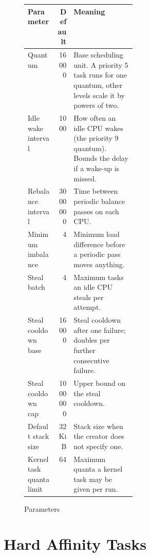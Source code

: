 \documentclass[11pt]{article}
\begin{document}
\begin{figure}[H]
	\centering
	\begin{tabularx}{\linewidth}{@{}>{\raggedright\arraybackslash}p{0.27\linewidth}rX@{}}
		\toprule
		\textbf{Parameter}       & \textbf{Default} & \textbf{Meaning}                                                                                      \\
		\midrule
		Quantum                  & 16000            & Base scheduling unit. A priority 5 task runs for one quantum, other levels scale it by powers of two. \\
		Idle wake interval       & 1000             & How often an idle CPU wakes (the priority 9 quantum). Bounds the delay if a wake-up is missed.        \\
		Rebalance interval       & 3000000          & Time between periodic balance passes on each CPU.                                                     \\
		Minimum imbalance        & 4                & Minimum load difference before a periodic pass moves anything.                                        \\
		Steal batch              & 4                & Maximum tasks an idle CPU steals per attempt.                                                         \\
		Steal cooldown base      & 16000            & Steal cooldown after one failure; doubles per further consecutive failure.                            \\
		Steal cooldown cap       & 1000000          & Upper bound on the steal cooldown.                                                                    \\
		Default stack size       & 32 KiB           & Stack size when the creator does not specify one.                                                     \\
		Kernel task quanta limit & 64               & Maximum quanta a kernel task may be given per run.                                                    \\
		\bottomrule
	\end{tabularx}
	\caption{Parameters}
	\label{fig:tunables}
\end{figure}

\section{Hard Affinity Tasks}
\label{sec:hard-affinity-takeover}
\end{document}
